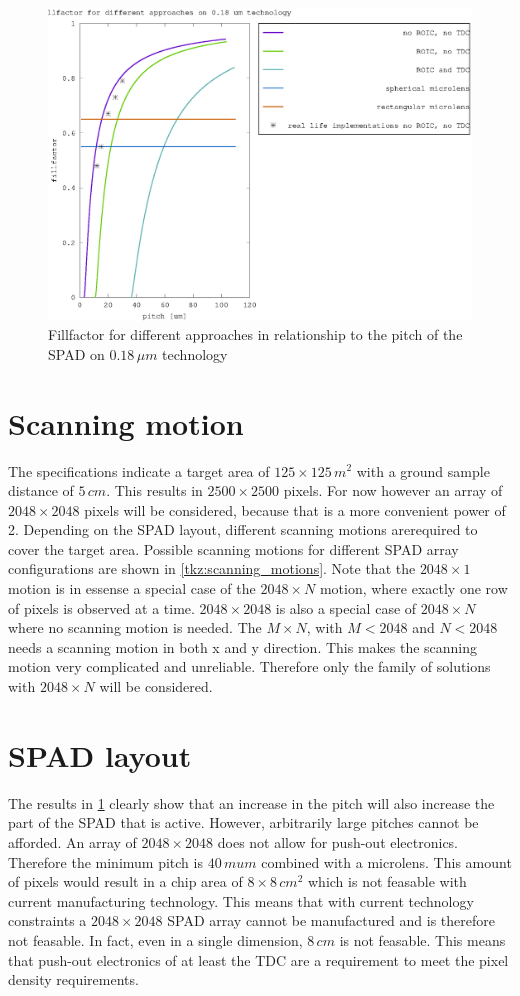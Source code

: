 \begin{figure}[h]
\centering
	\includegraphics[width=0.8\linewidth]{fig/effective_area.eps}
\caption{Fillfactor for different approaches in relationship to the pitch of the SPAD on $0.18\,\mu m$ technology}
\label{fig:effective_area}
\end{figure} 

\section{Scanning motion}\label{ssec:scanning_motion}
The specifications indicate a target area of $125\times125\,m^2$ with a ground sample distance of $5\,cm$. This results in $2500\times2500$ pixels. For now however an array of $2048\times2048$ pixels will be considered, because that is a more convenient power of 2. 
Depending on the SPAD layout, different scanning motions arerequired to cover the target area. Possible scanning motions for different SPAD array configurations are shown in \cref{tkz:scanning_motions}. Note that the $2048\times1$ motion is in essense a special case of the $2048\times N$ motion, where exactly one row of pixels is observed at a time. $2048\times2048$ is also a special case of $2048\times N$ where no scanning motion is needed. The $M\times N$, with $M<2048$ and $N<2048$ needs a scanning motion in both x and y direction. This makes the scanning motion very complicated and unreliable. Therefore only the family of solutions with $2048\times N$ will be considered.



\section{SPAD layout}\label{ssec:SPAD_layout}
The results in \cref{fig:effective_area} clearly show that an increase in the pitch will also increase the part of the SPAD that is active. However, arbitrarily large pitches cannot be afforded. An array of $2048\times2048$ does not allow for push-out electronics. Therefore the minimum pitch is $40\,mu m$ combined with a microlens. This amount of pixels would result in a chip area of $8\times8\,cm^2$ which is not feasable with current manufacturing technology. This means that with current technology constraints a $2048\times2048$ SPAD array cannot be manufactured and is therefore not feasable. In fact, even in a single dimension, $8\,cm$ is not feasable. This means that push-out electronics of at least the TDC are a requirement to meet the pixel density requirements.

